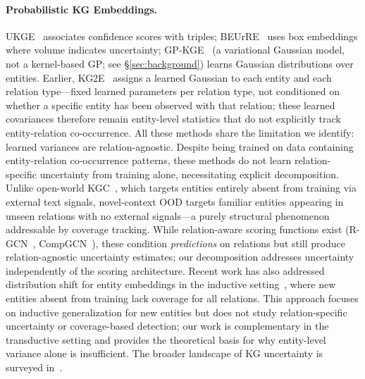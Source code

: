 
\paragraph{Probabilistic KG Embeddings.}
UKGE~\citep{chen2019embedding} associates confidence scores with triples; BEUrRE~\citep{chen2021probabilistic} uses box embeddings where volume indicates uncertainty; GP-KGE~\citep{choudhary2021perm} (a variational Gaussian model, not a kernel-based GP; see \S\ref{sec:background}) learns Gaussian distributions over entities.
Earlier, KG2E~\citep{he2015learning} assigns a learned Gaussian to each entity and each relation type---fixed learned parameters per relation type, not conditioned on whether a specific entity has been observed with that relation; these learned covariances therefore remain entity-level statistics that do not explicitly track entity-relation co-occurrence.
All these methods share the limitation we identify: learned variances are relation-agnostic.
Despite being trained on data containing entity-relation co-occurrence patterns, these methods do not learn relation-specific uncertainty from training alone, necessitating explicit decomposition.
Unlike open-world KGC~\citep{shi2018open}, which targets entities entirely absent from training via external text signals, novel-context OOD targets familiar entities appearing in unseen relations with no external signals---a purely structural phenomenon addressable by coverage tracking.
While relation-aware scoring functions exist (R-GCN~\citep{schlichtkrull2018modeling}, CompGCN~\citep{vashishth2020composition}), these condition \emph{predictions} on relations but still produce relation-agnostic uncertainty estimates; our decomposition addresses uncertainty independently of the scoring architecture.
Recent work has also addressed distribution shift for entity embeddings in the inductive setting~\citep{liu2025uncertainty}, where new entities absent from training lack coverage for all relations. This approach focuses on inductive generalization for new entities but does not study relation-specific uncertainty or coverage-based detection; our work is complementary in the transductive setting and provides the theoretical basis for why entity-level variance alone is insufficient. The broader landscape of KG uncertainty is surveyed in~\citet{jarnac2025uncertainty}.

